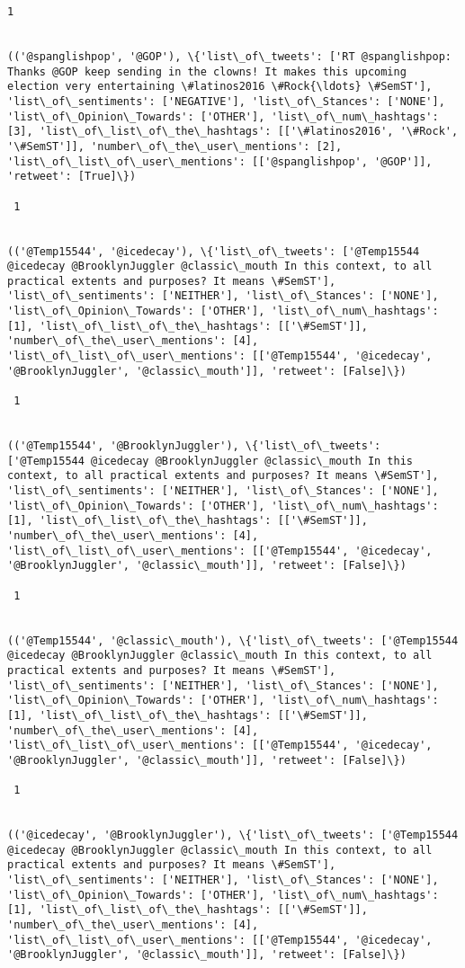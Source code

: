 \documentclass[11pt]{article}
\begin{document}
\begin{Verbatim}[commandchars=\\\{\}]
 1
 

(('@spanglishpop', '@GOP'), \{'list\_of\_tweets': ['RT @spanglishpop: Thanks @GOP keep sending in the clowns! It makes this upcoming election very entertaining \#latinos2016 \#Rock{\ldots} \#SemST'], 'list\_of\_sentiments': ['NEGATIVE'], 'list\_of\_Stances': ['NONE'], 'list\_of\_Opinion\_Towards': ['OTHER'], 'list\_of\_num\_hashtags': [3], 'list\_of\_list\_of\_the\_hashtags': [['\#latinos2016', '\#Rock', '\#SemST']], 'number\_of\_the\_user\_mentions': [2], 'list\_of\_list\_of\_user\_mentions': [['@spanglishpop', '@GOP']], 'retweet': [True]\})

 1
 

(('@Temp15544', '@icedecay'), \{'list\_of\_tweets': ['@Temp15544 @icedecay @BrooklynJuggler @classic\_mouth In this context, to all practical extents and purposes? It means \#SemST'], 'list\_of\_sentiments': ['NEITHER'], 'list\_of\_Stances': ['NONE'], 'list\_of\_Opinion\_Towards': ['OTHER'], 'list\_of\_num\_hashtags': [1], 'list\_of\_list\_of\_the\_hashtags': [['\#SemST']], 'number\_of\_the\_user\_mentions': [4], 'list\_of\_list\_of\_user\_mentions': [['@Temp15544', '@icedecay', '@BrooklynJuggler', '@classic\_mouth']], 'retweet': [False]\})

 1
 

(('@Temp15544', '@BrooklynJuggler'), \{'list\_of\_tweets': ['@Temp15544 @icedecay @BrooklynJuggler @classic\_mouth In this context, to all practical extents and purposes? It means \#SemST'], 'list\_of\_sentiments': ['NEITHER'], 'list\_of\_Stances': ['NONE'], 'list\_of\_Opinion\_Towards': ['OTHER'], 'list\_of\_num\_hashtags': [1], 'list\_of\_list\_of\_the\_hashtags': [['\#SemST']], 'number\_of\_the\_user\_mentions': [4], 'list\_of\_list\_of\_user\_mentions': [['@Temp15544', '@icedecay', '@BrooklynJuggler', '@classic\_mouth']], 'retweet': [False]\})

 1
 

(('@Temp15544', '@classic\_mouth'), \{'list\_of\_tweets': ['@Temp15544 @icedecay @BrooklynJuggler @classic\_mouth In this context, to all practical extents and purposes? It means \#SemST'], 'list\_of\_sentiments': ['NEITHER'], 'list\_of\_Stances': ['NONE'], 'list\_of\_Opinion\_Towards': ['OTHER'], 'list\_of\_num\_hashtags': [1], 'list\_of\_list\_of\_the\_hashtags': [['\#SemST']], 'number\_of\_the\_user\_mentions': [4], 'list\_of\_list\_of\_user\_mentions': [['@Temp15544', '@icedecay', '@BrooklynJuggler', '@classic\_mouth']], 'retweet': [False]\})

 1
 

(('@icedecay', '@BrooklynJuggler'), \{'list\_of\_tweets': ['@Temp15544 @icedecay @BrooklynJuggler @classic\_mouth In this context, to all practical extents and purposes? It means \#SemST'], 'list\_of\_sentiments': ['NEITHER'], 'list\_of\_Stances': ['NONE'], 'list\_of\_Opinion\_Towards': ['OTHER'], 'list\_of\_num\_hashtags': [1], 'list\_of\_list\_of\_the\_hashtags': [['\#SemST']], 'number\_of\_the\_user\_mentions': [4], 'list\_of\_list\_of\_user\_mentions': [['@Temp15544', '@icedecay', '@BrooklynJuggler', '@classic\_mouth']], 'retweet': [False]\})


\end{Verbatim}
\end{document}
